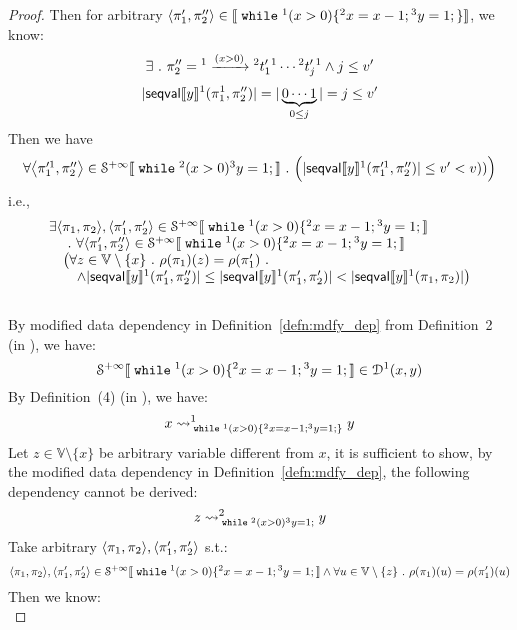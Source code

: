 \begin{example}
\begin{proof}
 Then for arbitrary $\left< \pi_1', \pi''_2 \right> \in \sem{\ewhile {}^1 (x > 0) \{{}^2 x = x - 1; {}^3 y = 1;\} }$, we know:
 \[
 	\exists ~.~ \pi''_2 =  {}^1 \xrightarrow{(x > 0)} {}^2 t'_1 {}^1 \cdots  {}^2 t'_{j} {}^1 \land j \leq v'
 \]
 \[
 	|\mathsf{seqval}\llbracket y \rrbracket{}^1(\pi_1^1, \pi_2'' )| = |\underbrace{0 \cdots 1}_{0 \leq j}| = j \leq v'
 \]
 Then we have
 \[
 \begin{array}{l}
 	\forall \left< \pi_1'^1, \pi''_2 \right> \in \mathcal{S}^{+\infty} \sem{\ewhile {}^2 (x > 0) {}^3 y = 1;} \st
 	\Big(
 	|\mathsf{seqval}\sem{y}{}^1(\pi_1'^1, \pi_2'' )| \leq v' < v))\Big)
 \end{array}
 \] 
 i.e.,
 \[
 	\begin{array}{l}
 	\exists \langle \pi_1, \pi_2 \rangle, \langle \pi_1', \pi_2' \rangle \in \mathcal{S}^{+\infty}\llbracket \;\mathtt{while}\; {}^1 (x > 0) \{{}^2 x = x - 1; {}^3 y = 1; \rrbracket \\
 	\quad ~.~ \forall \langle \pi_1', \pi_2'' \rangle \in \mathcal{S}^{+\infty}\llbracket \;\mathtt{while}\; {}^1 (x > 0) \{{}^2 x = x - 1; {}^3 y = 1; \rrbracket \\
 	\quad \big(
 	\forall z \in \mathbb{V}\setminus \{x\} ~.~ \rho(\pi_1)(z) = \rho(\pi_1') ~.~ \\
 	\quad  \quad  \land |\mathsf{seqval}\llbracket y \rrbracket{}^1(\pi_1', \pi_2'')| 
 	\leq |\mathsf{seqval}\llbracket y \rrbracket{}^1(\pi_1', \pi_2')| <  
 	|\mathsf{seqval}\llbracket y \rrbracket{}^1(\pi_1, \pi_2)|\big) 	
 	\end{array}
 \]
 \\
 By modified data dependency in Definition~\ref{defn:mdfy_dep} from Definition~2 (in \cite{cousot2019abstract}), we have:
 \[
 	\mathcal{S}^{+\infty}\llbracket \;\mathtt{while}\; {}^1 (x > 0) \{{}^2 x = x - 1; {}^3 y = 1; \rrbracket 
 	\in \mathcal{D}^1(x, y)
 \]
 By Definition~(4) (in \cite{cousot2019abstract}), we have:
 \[
 	x \rightsquigarrow^{1}_{\;\mathtt{while}\; {}^1 (x > 0) \{{}^2 x = x - 1; {}^3 y = 1;\}} y
 \]
 Let $z \in \mathbb{V}\setminus \{x\}$ be arbitrary variable different from $x$, it is sufficient to show,
 by the modified data dependency in Definition~\ref{defn:mdfy_dep}, the following dependency cannot be derived:
 \[
 	z \rightsquigarrow^{2}_{\;\mathtt{while}\; {}^2 (x > 0) {}^3 y = 1;} y
 \]
 Take arbitrary $\langle \pi_1, \pi_2 \rangle, \langle \pi_1', \pi_2' \rangle$ s.t.:
 \[
 	\langle \pi_1, \pi_2 \rangle, \langle \pi_1', \pi_2' \rangle \in \mathcal{S}^{+\infty}\llbracket \;\mathtt{while}\; {}^1 (x > 0) \{{}^2 x = x - 1; {}^3 y = 1; \rrbracket  
 	\land \forall u \in \mathbb{V}\setminus \{z\} ~.~ \rho(\pi_1)(u) = \rho(\pi_1')(u)
 	\]
 Then we know:
 \[
\]
\end{proof}
\end{example}
